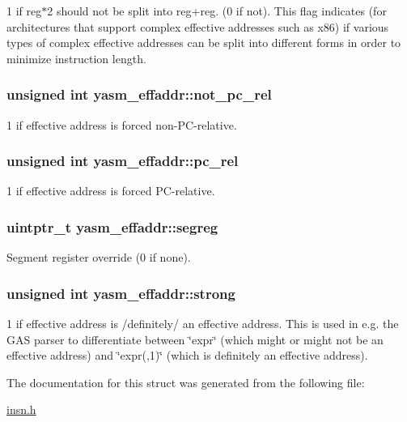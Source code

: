1 if reg$\ast$2 should not be split into reg+reg. (0 if not). This flag indicates (for architectures that support complex effective addresses such as x86) if various types of complex effective addresses can be split into different forms in order to minimize instruction length. \hypertarget{structyasm__effaddr_ae825a88f0ee21a86093ec55065484167}{
\subsubsection[{not\-\_\-pc\-\_\-rel}]{\setlength{\rightskip}{0pt plus 5cm}unsigned int yasm\-\_\-effaddr\-::not\-\_\-pc\-\_\-rel}}\label{structyasm__effaddr_ae825a88f0ee21a86093ec55065484167}
1 if effective address is forced non-\/\-P\-C-\/relative. \hypertarget{structyasm__effaddr_a0a3a4fb039306049fda3bc718ed33e2c}{
\subsubsection[{pc\-\_\-rel}]{\setlength{\rightskip}{0pt plus 5cm}unsigned int yasm\-\_\-effaddr\-::pc\-\_\-rel}}\label{structyasm__effaddr_a0a3a4fb039306049fda3bc718ed33e2c}
1 if effective address is forced P\-C-\/relative. \hypertarget{structyasm__effaddr_ae6539c0820d3b9a98fad42a547ea790a}{
\subsubsection[{segreg}]{\setlength{\rightskip}{0pt plus 5cm}uintptr\-\_\-t yasm\-\_\-effaddr\-::segreg}}\label{structyasm__effaddr_ae6539c0820d3b9a98fad42a547ea790a}
Segment register override (0 if none). \hypertarget{structyasm__effaddr_a8fa5c904fc7b7e5517a461e73036ba41}{
\subsubsection[{strong}]{\setlength{\rightskip}{0pt plus 5cm}unsigned int yasm\-\_\-effaddr\-::strong}}\label{structyasm__effaddr_a8fa5c904fc7b7e5517a461e73036ba41}
1 if effective address is /definitely/ an effective address. This is used in e.\-g. the G\-A\-S parser to differentiate between \char`\"{}expr\char`\"{} (which might or might not be an effective address) and \char`\"{}expr(,1)\char`\"{} (which is definitely an effective address). 

The documentation for this struct was generated from the following file\-:\begin{DoxyCompactItemize}
\item 
\hyperlink{insn_8h}{insn.\-h}\end{DoxyCompactItemize}
